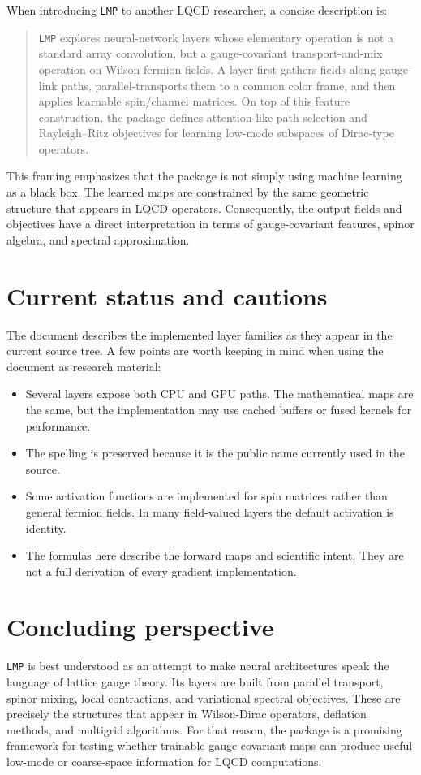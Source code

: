 \documentclass[11pt]{article}
\newcommand{\LMP}{\texttt{LMP}}
\newcommand{\code}[1]{\texttt{\detokenize{#1}}}
\begin{document}
When introducing \LMP{} to another LQCD researcher, a concise description is:
\begin{quote}
\LMP{} explores neural-network layers whose elementary operation is not a
standard array convolution, but a gauge-covariant transport-and-mix operation
on Wilson fermion fields. A layer first gathers fields along gauge-link paths,
parallel-transports them to a common color frame, and then applies learnable
spin/channel matrices. On top of this feature construction, the package defines
attention-like path selection and Rayleigh--Ritz objectives for learning
low-mode subspaces of Dirac-type operators.
\end{quote}

This framing emphasizes that the package is not simply using machine learning
as a black box. The learned maps are constrained by the same geometric
structure that appears in LQCD operators. Consequently, the output fields and
objectives have a direct interpretation in terms of gauge-covariant features,
spinor algebra, and spectral approximation.

\section{Current status and cautions}

The document describes the implemented layer families as they appear in the
current source tree. A few points are worth keeping in mind when using the
document as research material:
\begin{itemize}[leftmargin=*]
  \item Several layers expose both CPU and GPU paths. The mathematical maps are
        the same, but the implementation may use cached buffers or fused kernels
        for performance.
  \item The spelling \code{PrallelTransportAttention_Layer} is preserved because
        it is the public name currently used in the source.
  \item Some activation functions are implemented for spin matrices rather than
        general fermion fields. In many field-valued layers the default
        activation is identity.
  \item The formulas here describe the forward maps and scientific intent. They
        are not a full derivation of every gradient implementation.
\end{itemize}

\section{Concluding perspective}

\LMP{} is best understood as an attempt to make neural architectures speak the
language of lattice gauge theory. Its layers are built from parallel transport,
spinor mixing, local contractions, and variational spectral objectives. These
are precisely the structures that appear in Wilson-Dirac operators, deflation
methods, and multigrid algorithms. For that reason, the package is a promising
framework for testing whether trainable gauge-covariant maps can produce useful
low-mode or coarse-space information for LQCD computations.
\end{document}
